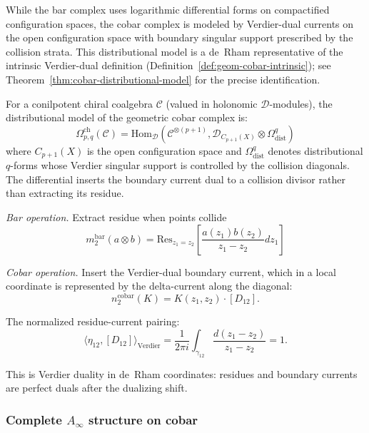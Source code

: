 While the bar complex uses logarithmic differential forms on
compactified configuration spaces, the cobar complex is modeled by
Verdier-dual currents on the open configuration space with boundary
singular support prescribed by the collision strata. This
distributional model is a de~Rham representative of the intrinsic
Verdier-dual definition (Definition~\ref{def:geom-cobar-intrinsic});
see Theorem~\ref{thm:cobar-distributional-model} for the precise
identification.

\begin{definition}\label{def:geom-cobar-precise}
For a conilpotent chiral coalgebra $\mathcal{C}$ (valued in holonomic $\mathcal{D}$-modules), the distributional model of the geometric cobar complex is:
\[\Omega^{\text{ch}}_{p,q}(\mathcal{C}) = \text{Hom}_{\mathcal{D}}\left(\mathcal{C}^{\otimes(p+1)}, \mathcal{D}_{C_{p+1}(X)} \otimes \Omega^q_{\text{dist}}\right)\]
where $C_{p+1}(X)$ is the open configuration space and
$\Omega^q_{\text{dist}}$ denotes distributional $q$-forms whose
Verdier singular support is controlled by the collision diagonals.
The differential inserts the boundary current dual to a collision
divisor rather than extracting its residue.
\end{definition}

\begin{example}
\emph{Bar operation.} Extract residue when points collide
\[m_2^{\text{bar}}(a \otimes b) = \text{Res}_{z_1=z_2}\left[\frac{a(z_1)b(z_2)}{z_1-z_2}dz_1\right]\]

\emph{Cobar operation.} Insert the Verdier-dual boundary current,
which in a local coordinate is represented by the delta-current
along the diagonal:
\[n_2^{\text{cobar}}(K) = K(z_1,z_2) \cdot [D_{12}].\]

The normalized residue-current pairing:
\[
\langle \eta_{12}, [D_{12}] \rangle_{\mathrm{Verdier}}
=
\frac{1}{2\pi i}
\int_{\gamma_{12}}\frac{d(z_1-z_2)}{z_1-z_2}
=1 .
\]

This is Verdier duality in de~Rham coordinates: residues and boundary
currents are perfect duals after the dualizing shift.
\end{example}

\subsubsection{\texorpdfstring{Complete $A_\infty$ structure on cobar}{Complete A-infinity structure on cobar}}

